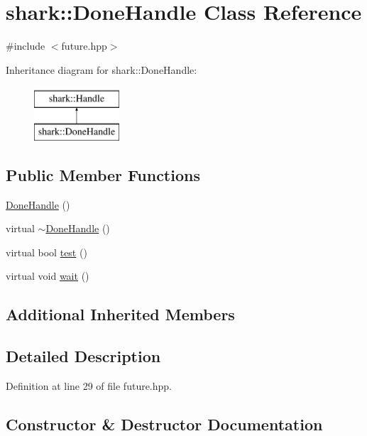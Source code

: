 \hypertarget{classshark_1_1_done_handle}{}\section{shark\+:\+:Done\+Handle Class Reference}
\label{classshark_1_1_done_handle}


{\ttfamily \#include $<$future.\+hpp$>$}

Inheritance diagram for shark\+:\+:Done\+Handle\+:\begin{figure}[H]
\begin{center}
\leavevmode
\includegraphics[height=2.000000cm]{classshark_1_1_done_handle}
\end{center}
\end{figure}
\subsection*{Public Member Functions}
\begin{DoxyCompactItemize}
\item 
\hyperlink{classshark_1_1_done_handle_ad4007e3e95525b9f6ff20738b1eee4e3}{Done\+Handle} ()
\item 
virtual \hyperlink{classshark_1_1_done_handle_a2b414f29067919ac09cc37fabf22e716}{$\sim$\+Done\+Handle} ()
\item 
virtual bool \hyperlink{classshark_1_1_done_handle_aa2207dc4b61f0bffcbfb56aa9f9b0b46}{test} ()
\item 
virtual void \hyperlink{classshark_1_1_done_handle_a99b4b58b01738073650b9c452e35b7e8}{wait} ()
\end{DoxyCompactItemize}
\subsection*{Additional Inherited Members}


\subsection{Detailed Description}


Definition at line 29 of file future.\+hpp.



\subsection{Constructor \& Destructor Documentation}
\hypertarget{classshark_1_1_done_handle_ad4007e3e95525b9f6ff20738b1eee4e3}{}\label{classshark_1_1_done_handle_ad4007e3e95525b9f6ff20738b1eee4e3} 
